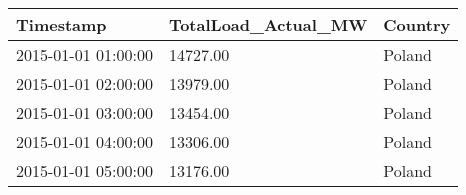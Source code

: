 \begin{tabular}{lll}
\toprule
Timestamp & TotalLoad\_Actual\_MW & Country \\
\midrule
2015-01-01 01:00:00 & 14727.00 & Poland \\
2015-01-01 02:00:00 & 13979.00 & Poland \\
2015-01-01 03:00:00 & 13454.00 & Poland \\
2015-01-01 04:00:00 & 13306.00 & Poland \\
2015-01-01 05:00:00 & 13176.00 & Poland \\
\bottomrule
\end{tabular}
